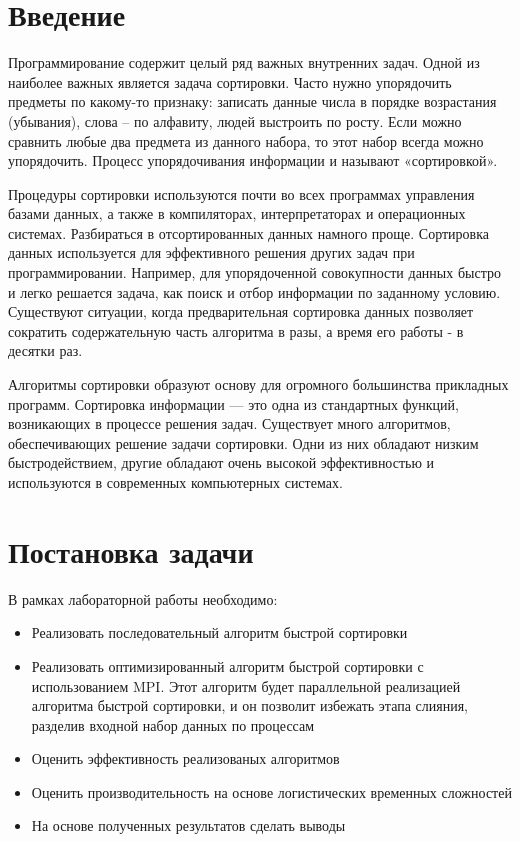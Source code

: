 \documentclass{report}
\begin{document}
\section*{Введение}
Программирование содержит целый ряд важных внутренних задач. Одной из наиболее важных является задача сортировки. Часто нужно упорядочить предметы по какому-то признаку: записать данные числа в порядке возрастания (убывания), слова – по алфавиту, людей выстроить по росту. Если можно сравнить любые два предмета из данного набора, то этот набор всегда можно упорядочить. Процесс упорядочивания информации и называют «сортировкой». 
\par Процедуры сортировки используются почти во всех программах управления базами данных, а также в компиляторах, интерпретаторах и операционных системах. Разбираться в отсортированных данных намного проще. Сортировка данных используется для эффективного решения других задач при программировании. Например, для упорядоченной совокупности данных быстро и легко решается задача, как поиск и отбор информации по заданному условию. Существуют ситуации, когда предварительная сортировка данных позволяет сократить содержательную часть алгоритма в разы, а время его работы - в десятки раз. 

\par Алгоритмы сортировки образуют основу для огромного большинства прикладных программ. Сортировка информации — это одна из стандартных функций, возникающих в процессе решения задач. Существует много алгоритмов, обеспечивающих решение задачи сортировки. Одни из них обладают низким быстродействием, другие обладают очень высокой эффективностью и используются в современных компьютерных системах. 

\newpage

\section*{Постановка задачи}
В рамках лабораторной работы необходимо:
\begin{itemize}
    \item Реализовать последовательный алгоритм быстрой сортировки
    \item Реализовать оптимизированный алгоритм быстрой сортировки с использованием MPI. Этот алгоритм будет параллельной реализацией алгоритма быстрой сортировки, и он позволит избежать этапа слияния, разделив входной набор данных по процессам
    \item Оценить эффективность реализованых алгоритмов
    \item Оценить производительность на основе логистических временных сложностей
    \item На основе полученных результатов сделать выводы
\end{itemize}
\newpage
\end{document}
